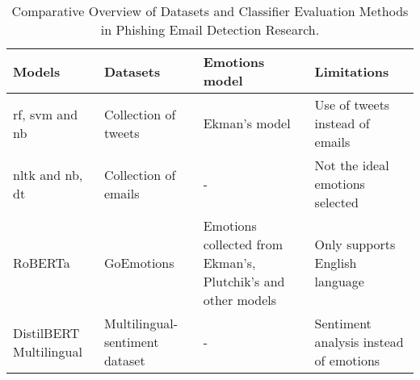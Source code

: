 \begin{table}[ht]
    \centering
    \begin{tabular}{p{2cm}p{4cm}p{4cm}p{4cm}}
    \hline
    \textbf{Models} & \textbf{Datasets} & \textbf{Emotions model} & \textbf{Limitations}\\
    \hline
    \ac{rf}, \ac{svm} and \ac{nb} \cite{SAILUNAZ2019101003} & Collection of tweets & Ekman's model & Use of tweets instead of emails \\
    \hline
    \ac{nltk} and \ac{nb}, \ac{dt} \cite{10085351} & Collection of emails & - & Not the ideal emotions selected\\
    \hline
    RoBERTa \cite{liu2019roberta} & GoEmotions \cite{demszky2020goemotions} & Emotions collected from Ekman's, Plutchik's and other models & Only supports English language \\
    \hline
    DistilBERT \cite{sanh2019distilbert} Multilingual & Multilingual-sentiment dataset & - & Sentiment analysis instead of emotions \\
    \hline
    \end{tabular}
    \caption{Comparative Overview of Datasets and Classifier Evaluation Methods in Phishing Email Detection Research.}
    \label{tbl:c2:emotions_table}
    \end{table}